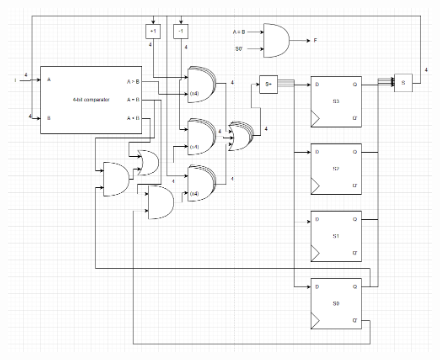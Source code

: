 \documentclass{article}
\begin{document}
\begin{enumerate}[label=\alph*.]
\begin{figure}[!h]
    \includegraphics[width=1\textwidth]{figures/fsm2e-solution.png}
\end{figure}
\end{enumerate}

\newpage
\end{document}
